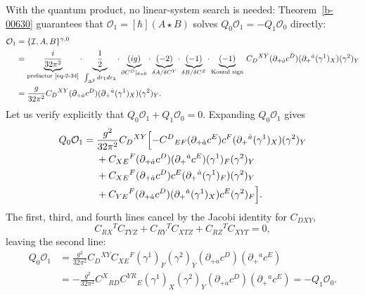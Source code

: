 \documentclass[11pt]{article}
\numberwithin{equation}{section}
\numberwithin{figure}{section}
\numberwithin{table}{section}
\begin{document}
With the quantum product, no linear-system search is needed: Theorem~\ref{b-00630} guarantees that $\mathcal O_1=[\hbar](A\star B)$ solves $Q_0\mathcal O_1=-Q_1\mathcal O_0$ directly:
\begin{equation}\label{eq-2-65}
\begin{aligned}
\mathcal O_1
&=\{\mathcal I,A,B\}^{\gamma,0}\\
&=\underbrace{\frac{i}{32\pi^2}}_{\text{prefactor \eqref{eq-2-34}}}
\cdot\underbrace{\frac12}_{\int_{\Delta^2}dr_1dr_2}
\cdot\underbrace{(ig)}_{\partial C^D|_{\theta=0}}
\cdot\underbrace{(-2)}_{\delta A/\delta C^Y}
\cdot\underbrace{(-1)}_{\delta B/\delta C^Z}
\cdot\underbrace{(-1)}_{\text{Koszul sign}}\,
C_D{}^{XY}(\partial_{+\dot a}c^D)
(\partial_+{}^{\dot a}(\gamma^1)_X)(\gamma^2)_Y\\
&=\frac{g}{32\pi^2}C_D{}^{XY}(\partial_{+\dot a}c^D)
(\partial_+{}^{\dot a}(\gamma^1)_X)(\gamma^2)_Y.
\end{aligned}
\end{equation}
Let us verify explicitly that $Q_0\mathcal O_1+Q_1\mathcal O_0=0$. Expanding $Q_0\mathcal O_1$ gives
\begin{equation}\label{eq-scalarfermionexpand}
\begin{aligned}
Q_0\mathcal O_1={}&\frac{g^2}{32\pi^2}C_D{}^{XY}\Bigl[
-C^D{}_{EF}(\partial_{+\dot a}c^E)c^F
(\partial_+{}^{\dot a}(\gamma^1)_X)(\gamma^2)_Y\\
&+C_{XE}{}^F(\partial_{+\dot a}c^D)
(\partial_+{}^{\dot a}c^E)(\gamma^1)_F(\gamma^2)_Y\\
&+C_{XE}{}^F(\partial_{+\dot a}c^D)c^E
(\partial_+{}^{\dot a}(\gamma^1)_F)(\gamma^2)_Y\\
&+C_{YE}{}^F(\partial_{+\dot a}c^D)
(\partial_+{}^{\dot a}(\gamma^1)_X)c^E(\gamma^2)_F
\Bigr].
\end{aligned}
\end{equation}
The first, third, and fourth lines cancel by the Jacobi identity for $C_{DXY}$,
\begin{equation}\label{b-00670}
C_{RX}{}^TC_{TYZ}+C_{RY}{}^TC_{XTZ}+C_{RZ}{}^TC_{XYT}=0,
\end{equation}
leaving the second line:
\begin{equation}\label{eq-2-66}
\begin{aligned}
Q_0\mathcal O_1
&=\frac{g^2}{32\pi^2}
C_D{}^{XY}C_{XE}{}^F(\gamma^1)_F(\gamma^2)_Y
(\partial_{+\dot a}c^D)(\partial_+{}^{\dot a}c^E)\\
&=-\frac{g^2}{32\pi^2}
C^X{}_{RD}C^{YR}{}_{E}(\gamma^1)_X(\gamma^2)_Y
(\partial_{+\dot a}c^D)(\partial_+{}^{\dot a}c^E)
=-Q_1\mathcal O_0.
\end{aligned}
\end{equation}
\end{document}
